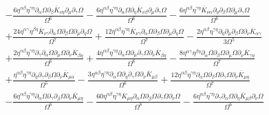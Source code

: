 \documentclass[10pt,letterpaper]{article}
\numberwithin{equation}{section}
\begin{document}
\begin{align}
&-  \frac{6 \eta^{\alpha \beta} \eta^{\gamma \eta} \partial_{\alpha}\Omega \partial_{\beta}\overline{K}_{\nu \eta} \partial_{\mu}\partial_{\gamma}\Omega}{\Omega^6} -  \frac{6 \eta^{\alpha \beta} \eta^{\gamma \eta} \partial_{\alpha}\Omega \partial_{\eta}\overline{K}_{\nu \beta} \partial_{\mu}\partial_{\gamma}\Omega}{\Omega^6} -  \frac{6 \eta^{\alpha \beta} \eta^{\gamma \eta} \overline{K}_{\nu \alpha} \partial_{\eta}\partial_{\beta}\Omega \partial_{\mu}\partial_{\gamma}\Omega}{\Omega^6} \nonumber \\
&+ \frac{24 \eta^{\alpha \gamma} \eta^{\beta \eta} \overline{K}_{\nu \gamma} \partial_{\alpha}\Omega \partial_{\beta}\Omega \partial_{\mu}\partial_{\eta}\Omega}{\Omega^7} + \frac{12 \eta^{\alpha \beta} \eta^{\gamma \eta} \overline{K}_{\nu \gamma} \partial_{\alpha}\Omega \partial_{\beta}\Omega \partial_{\mu}\partial_{\eta}\Omega}{\Omega^7} -  \frac{2 \eta^{\alpha \beta} \eta^{\gamma \eta} \partial_{\eta}\partial_{\mu}\partial_{\beta}\Omega \partial_{\nu}\overline{K}_{\alpha \gamma}}{3 \Omega^5} \nonumber \\
&+ \frac{2 \eta^{\alpha \beta} \eta^{\gamma \eta} \partial_{\gamma}\partial_{\alpha}\Omega \partial_{\mu}\Omega \partial_{\nu}\overline{K}_{\beta \eta}}{\Omega^6} + \frac{4 \eta^{\alpha \beta} \eta^{\gamma \eta} \partial_{\alpha}\Omega \partial_{\mu}\partial_{\gamma}\Omega \partial_{\nu}\overline{K}_{\beta \eta}}{\Omega^6} -  \frac{8 \eta^{\alpha \gamma} \eta^{\beta \eta} \partial_{\alpha}\Omega \partial_{\beta}\Omega \partial_{\mu}\Omega \partial_{\nu}\overline{K}_{\gamma \eta}}{\Omega^7}\nonumber \\
& + \frac{\eta^{\alpha \beta} \eta^{\gamma \eta} \partial_{\eta}\partial_{\gamma}\partial_{\beta}\Omega \partial_{\nu}\overline{K}_{\mu \alpha}}{\Omega^5} -  \frac{3 \eta^{\alpha \beta} \eta^{\gamma \eta} \partial_{\alpha}\Omega \partial_{\eta}\partial_{\gamma}\Omega \partial_{\nu}\overline{K}_{\mu \beta}}{\Omega^6} + \frac{12 \eta^{\alpha \beta} \eta^{\gamma \eta} \partial_{\alpha}\Omega \partial_{\beta}\Omega \partial_{\gamma}\Omega \partial_{\nu}\overline{K}_{\mu \eta}}{\Omega^7} \nonumber \\
&-  \frac{6 \eta^{\alpha \beta} \eta^{\gamma \eta} \partial_{\alpha}\Omega \partial_{\gamma}\partial_{\beta}\Omega \partial_{\nu}\overline{K}_{\mu \eta}}{\Omega^6} -  \frac{60 \eta^{\alpha \beta} \eta^{\gamma \eta} \overline{K}_{\mu \eta} \partial_{\alpha}\Omega \partial_{\beta}\Omega \partial_{\gamma}\Omega \partial_{\nu}\Omega}{\Omega^8} -  \frac{6 \eta^{\alpha \beta} \eta^{\gamma \eta} \partial_{\gamma}\partial_{\alpha}\Omega \partial_{\eta}\overline{K}_{\mu \beta} \partial_{\nu}\Omega}{\Omega^6} \nonumber \\

\end{align}
\end{document}
